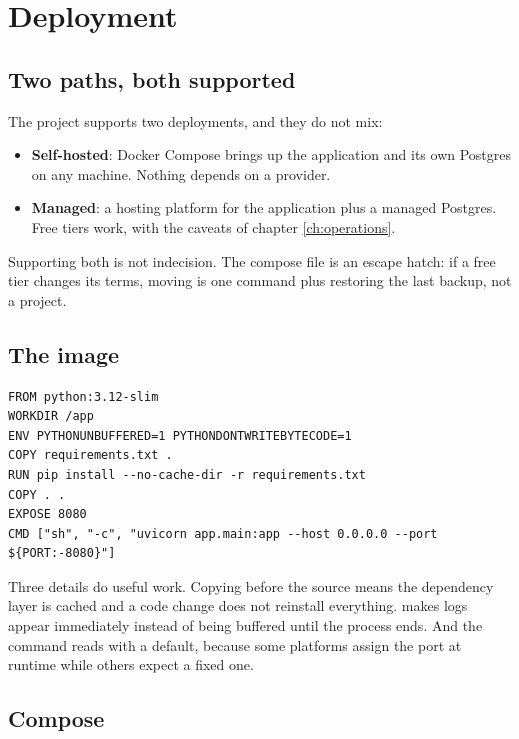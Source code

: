 \chapter{Deployment}
\label{ch:deployment}

\section{Two paths, both supported}

The project supports two deployments, and they do not mix:

\begin{itemize}
  \item \textbf{Self-hosted}: Docker Compose brings up the application and its
        own Postgres on any machine. Nothing depends on a provider.
  \item \textbf{Managed}: a hosting platform for the application plus a managed
        Postgres. Free tiers work, with the caveats of chapter
        \ref{ch:operations}.
\end{itemize}

Supporting both is not indecision. The compose file is an escape hatch: if a
free tier changes its terms, moving is one command plus restoring the last
backup, not a project.

\section{The image}

\begin{lstlisting}[style=sh]
FROM python:3.12-slim
WORKDIR /app
ENV PYTHONUNBUFFERED=1 PYTHONDONTWRITEBYTECODE=1
COPY requirements.txt .
RUN pip install --no-cache-dir -r requirements.txt
COPY . .
EXPOSE 8080
CMD ["sh", "-c", "uvicorn app.main:app --host 0.0.0.0 --port ${PORT:-8080}"]
\end{lstlisting}

Three details do useful work. Copying  before the source
means the dependency layer is cached and a code change does not reinstall
everything.  makes logs appear immediately instead of
being buffered until the process ends. And the command reads  with
a default, because some platforms assign the port at runtime while others expect
a fixed one.

\section{Compose}

